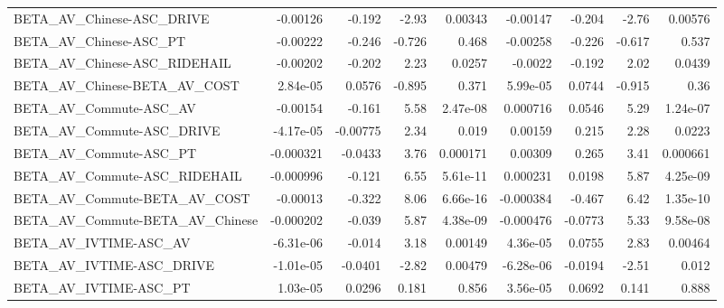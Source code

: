 \begin{tabular}{lrrrrrrrr}
BETA\_AV\_Chinese-ASC\_DRIVE                          &    -0.00126 &       -0.192 &     -2.93 &  0.00343 &   -0.00147 &      -0.204 &        -2.76 &       0.00576 \\
BETA\_AV\_Chinese-ASC\_PT                             &    -0.00222 &       -0.246 &    -0.726 &    0.468 &   -0.00258 &      -0.226 &       -0.617 &         0.537 \\
BETA\_AV\_Chinese-ASC\_RIDEHAIL                       &    -0.00202 &       -0.202 &      2.23 &   0.0257 &    -0.0022 &      -0.192 &         2.02 &        0.0439 \\
BETA\_AV\_Chinese-BETA\_AV\_COST                       &    2.84e-05 &       0.0576 &    -0.895 &    0.371 &   5.99e-05 &      0.0744 &       -0.915 &          0.36 \\
BETA\_AV\_Commute-ASC\_AV                             &    -0.00154 &       -0.161 &      5.58 & 2.47e-08 &   0.000716 &      0.0546 &         5.29 &      1.24e-07 \\
BETA\_AV\_Commute-ASC\_DRIVE                          &   -4.17e-05 &     -0.00775 &      2.34 &    0.019 &    0.00159 &       0.215 &         2.28 &        0.0223 \\
BETA\_AV\_Commute-ASC\_PT                             &   -0.000321 &      -0.0433 &      3.76 & 0.000171 &    0.00309 &       0.265 &         3.41 &      0.000661 \\
BETA\_AV\_Commute-ASC\_RIDEHAIL                       &   -0.000996 &       -0.121 &      6.55 & 5.61e-11 &   0.000231 &      0.0198 &         5.87 &      4.25e-09 \\
BETA\_AV\_Commute-BETA\_AV\_COST                       &    -0.00013 &       -0.322 &      8.06 & 6.66e-16 &  -0.000384 &      -0.467 &         6.42 &      1.35e-10 \\
BETA\_AV\_Commute-BETA\_AV\_Chinese                    &   -0.000202 &       -0.039 &      5.87 & 4.38e-09 &  -0.000476 &     -0.0773 &         5.33 &      9.58e-08 \\
BETA\_AV\_IVTIME-ASC\_AV                              &   -6.31e-06 &       -0.014 &      3.18 &  0.00149 &   4.36e-05 &      0.0755 &         2.83 &       0.00464 \\
BETA\_AV\_IVTIME-ASC\_DRIVE                           &   -1.01e-05 &      -0.0401 &     -2.82 &  0.00479 &  -6.28e-06 &     -0.0194 &        -2.51 &         0.012 \\
BETA\_AV\_IVTIME-ASC\_PT                              &    1.03e-05 &       0.0296 &     0.181 &    0.856 &   3.56e-05 &      0.0692 &        0.141 &         0.888 \\

\end{tabular}
